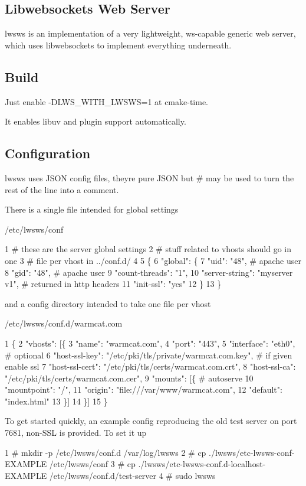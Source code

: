 \subsection*{Libwebsockets Web Server }

lwsws is an implementation of a very lightweight, ws-\/capable generic web server, which uses libwebsockets to implement everything underneath.

\subsection*{Build }

Just enable -\/\+D\+L\+W\+S\+\_\+\+W\+I\+T\+H\+\_\+\+L\+W\+S\+WS=1 at cmake-\/time.

It enables libuv and plugin support automatically.

\subsection*{Configuration }

lwsws uses J\+S\+ON config files, they\textquotesingle{}re pure J\+S\+ON but \# may be used to turn the rest of the line into a comment.

There is a single file intended for global settings

/etc/lwsws/conf 
\begin{DoxyCode}
1 # these are the server global settings
2 # stuff related to vhosts should go in one
3 # file per vhost in ../conf.d/
4 
5 \{
6   "global": \{
7    "uid": "48",  # apache user
8    "gid": "48",  # apache user
9    "count-threads": "1",
10    "server-string": "myserver v1", # returned in http headers
11    "init-ssl": "yes"
12  \}
13 \}
\end{DoxyCode}
 and a config directory intended to take one file per vhost

/etc/lwsws/conf.d/warmcat.\+com 
\begin{DoxyCode}
1 \{
2         "vhosts": [\{
3                 "name": "warmcat.com",
4                 "port": "443",
5                 "interface": "eth0",  # optional
6                 "host-ssl-key": "/etc/pki/tls/private/warmcat.com.key",  # if given enable ssl
7                 "host-ssl-cert": "/etc/pki/tls/certs/warmcat.com.crt",
8                 "host-ssl-ca": "/etc/pki/tls/certs/warmcat.com.cer",
9                 "mounts": [\{  # autoserve
10                         "mountpoint": "/",
11                         "origin": "file:///var/www/warmcat.com",
12                         "default": "index.html"
13                 \}]
14         \}]
15 \}
\end{DoxyCode}
 To get started quickly, an example config reproducing the old test server on port 7681, non-\/\+S\+SL is provided. To set it up 
\begin{DoxyCode}
1 # mkdir -p /etc/lwsws/conf.d /var/log/lwsws
2 # cp ./lwsws/etc-lwsws-conf-EXAMPLE /etc/lwsws/conf
3 # cp ./lwsws/etc-lwsws-conf.d-localhost-EXAMPLE /etc/lwsws/conf.d/test-server
4 # sudo lwsws
\end{DoxyCode}
